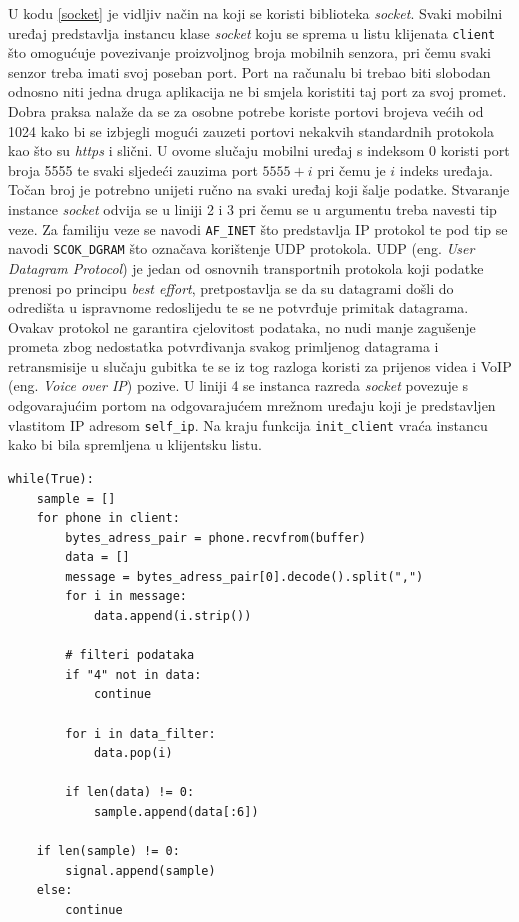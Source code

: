 \documentclass[times, utf8, diplomski]{fer}
\begin{document}
U kodu \ref{socket} je vidljiv način na koji se koristi biblioteka \textit{socket}. Svaki mobilni uređaj predstavlja instancu klase \textit{socket} koju se sprema
u listu klijenata \texttt{client} što omogućuje povezivanje proizvoljnog broja mobilnih senzora, pri čemu svaki senzor treba imati svoj poseban port. Port na računalu
bi trebao biti slobodan odnosno niti jedna druga aplikacija ne bi smjela koristiti taj port za svoj promet. Dobra praksa nalaže da se za osobne potrebe koriste portovi
brojeva većih od 1024 kako bi se izbjegli mogući zauzeti portovi nekakvih standardnih protokola kao što su \textit{https} i slični. U ovome slučaju mobilni uređaj
s indeksom 0 koristi port broja 5555 te svaki sljedeći zauzima port $5555 + i$ pri čemu je $i$ indeks uređaja. Točan broj je potrebno unijeti ručno na svaki uređaj
koji šalje podatke. Stvaranje instance \textit{socket} odvija se u liniji 2 i 3 pri čemu se u argumentu treba navesti tip veze. Za familiju veze se navodi
\texttt{AF\_INET} što predstavlja IP protokol te pod tip se navodi \texttt{SCOK\_DGRAM} što označava korištenje UDP protokola. UDP (eng. \textit{User Datagram Protocol})
je jedan od osnovnih transportnih protokola koji podatke prenosi po principu \textit{best effort}, pretpostavlja se da su datagrami došli do odredišta u ispravnome redoslijedu
te se ne potvrđuje primitak datagrama. Ovakav protokol ne garantira cjelovitost podataka, no nudi manje zagušenje prometa zbog nedostatka potvrđivanja svakog primljenog
datagrama i retransmisije u slučaju gubitka te se iz tog razloga koristi za prijenos videa i VoIP (eng. \textit{Voice over IP}) pozive. U liniji 4 se instanca razreda
\textit{socket} povezuje s odgovarajućim portom na odgovarajućem mrežnom uređaju koji je predstavljen vlastitom IP adresom \texttt{self\_ip}. Na kraju funkcija
\texttt{init\_client} vraća instancu kako bi bila spremljena u klijentsku listu.

\begin{lstlisting}[caption=Primanje podataka, label=primanje]
while(True):
    sample = []
    for phone in client:
        bytes_adress_pair = phone.recvfrom(buffer)
        data = []
        message = bytes_adress_pair[0].decode().split(",")
        for i in message:
            data.append(i.strip())

        # filteri podataka
        if "4" not in data:
            continue

        for i in data_filter:
            data.pop(i)
        
        if len(data) != 0:
            sample.append(data[:6])
            
    if len(sample) != 0:
        signal.append(sample)
    else:
        continue
\end{lstlisting}
\end{document}
